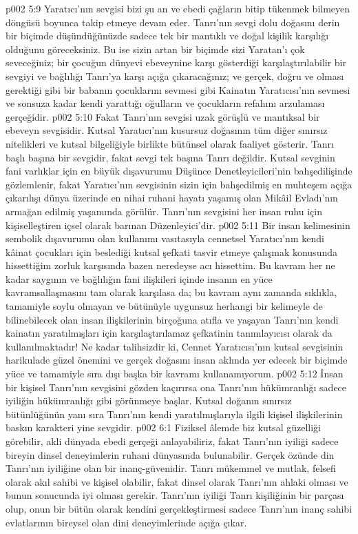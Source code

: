 \vs p002 5:9 Yaratıcı’nın sevgisi bizi şu an ve ebedi çağların bitip tükenmek bilmeyen döngüsü boyunca takip etmeye devam eder. Tanrı’nın sevgi dolu doğasını derin bir biçimde düşündüğünüzde sadece tek bir mantıklı ve doğal kişilik karşılığı olduğunu göreceksiniz. Bu ise sizin artan bir biçimde sizi Yaratan’ı çok seveceğiniz; bir çocuğun dünyevi ebeveynine karşı gösterdiği karşılaştırılabilir bir sevgiyi ve bağlılığı Tanrı’ya karşı açığa çıkaracağınız; ve gerçek, doğru ve olması gerektiği gibi bir babanın çocuklarını sevmesi gibi Kainatın Yaratıcısı’nın sevmesi ve sonsuza kadar kendi yarattığı oğulların ve çocukların refahını arzulaması gerçeğidir.
\vs p002 5:10 Fakat Tanrı’nın sevgisi uzak görüşlü ve mantıksal bir ebeveyn sevgisidir. Kutsal Yaratıcı’nın kusursuz doğasının tüm diğer sınırsız nitelikleri ve kutsal bilgeliğiyle birlikte bütünsel olarak faaliyet gösterir. Tanrı başlı başına bir sevgidir, fakat sevgi tek başına Tanrı değildir. Kutsal sevginin fani varlıklar için en büyük dışavurumu Düşünce Denetleyicileri’nin bahşedilişinde gözlemlenir, fakat Yaratıcı’nın sevgisinin sizin için bahşedilmiş en muhteşem açığa çıkarılışı dünya üzerinde en nihai ruhani hayatı yaşamış olan Mikâil Evladı’nın armağan edilmiş yaşamında görülür. Tanrı’nın sevgisini her insan ruhu için kişiselleştiren içsel olarak barınan Düzenleyici’dir.
\vs p002 5:11 Bir insan kelimesinin sembolik dışavurumu olan  kullanımı vasıtasıyla cennetsel Yaratıcı’nın kendi kâinat çocukları için beslediği kutsal şefkati tasvir etmeye çalışmak konusunda hissettiğim zorluk karşısında bazen neredeyse acı hissettim. Bu kavram her ne kadar saygının ve bağlılığın fani ilişkileri içinde insanın en yüce kavramsallaşmasını tam olarak karşılasa da; bu kavram aynı zamanda sıklıkla, tamamiyle soylu olmayan ve bütünüyle uygunsuz herhangi bir kelimeyle de bilinebilecek olan insan ilişkilerinin birçoğuna atıfla ve yaşayan Tanrı’nın kendi kainatın yaratılmışları için karşılaştırılamaz şefkatinin tanımlayıcısı olarak da kullanılmaktadır! Ne kadar talihsizdir ki, Cennet Yaratıcısı’nın kutsal sevgisinin harikulade güzel önemini ve gerçek doğasını insan aklında yer edecek bir biçimde yüce ve tamamiyle sıra dışı başka bir kavramı kullanamıyorum.
\vs p002 5:12 İnsan bir kişisel Tanrı’nın sevgisini gözden kaçırırsa ona Tanrı’nın hükümranlığı sadece iyiliğin hükümranlığı gibi görünmeye başlar. Kutsal doğanın sınırsız bütünlüğünün yanı sıra Tanrı’nın kendi yaratılmışlarıyla ilgili kişisel ilişkilerinin baskın karakteri yine sevgidir.
\vs p002 6:1 Fiziksel âlemde biz kutsal güzelliği görebilir, akli dünyada ebedi gerçeği anlayabiliriz, fakat Tanrı’nın iyiliği sadece bireyin dinsel deneyimlerin ruhani dünyasında bulunabilir. Gerçek özünde din Tanrı’nın iyiliğine olan bir inanç\hyp{}güvenidir. Tanrı mükemmel ve mutlak, felsefi olarak akıl sahibi ve kişisel olabilir, fakat dinsel olarak Tanrı’nın ahlaki olması ve bunun sonucunda iyi olması gerekir. Tanrı’nın iyiliği Tanrı kişiliğinin bir parçası olup, onun bir bütün olarak kendini gerçekleştirmesi sadece Tanrı’nın inanç sahibi evlatlarının bireysel olan dini deneyimlerinde açığa çıkar.
